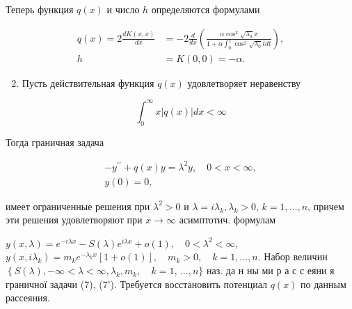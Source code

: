 \documentclass[10pt]{article}
\begin{document}
Теперь функция $q(x)$ и число $h$ определяются формулами



\[

\begin{aligned}

q(x)=2 \frac{d K(x, x)}{d x} & =-2 \frac{d}{d x}\left(\frac{\alpha \cos ^{2} \sqrt{\lambda_{0}} x}{1+\alpha \int_{0}^{x} \cos ^{2} \sqrt{\lambda_{0}} t d t}\right), \\

h & =K(0,0)=-\alpha .

\end{aligned}

\]



\begin{enumerate}

  \setcounter{enumi}{1}

  \item Пусть действительная функция $q(x)$ удовлетворяет неравенству

\end{enumerate}



\[

\int_{0}^{\infty} x|q(x)| d x<\infty

\]



Тогда граничная задача



\[

\begin{gathered}

-y^{\prime \prime}+q(x) y=\lambda^{2} y, \quad 0<x<\infty, \\

y(0)=0,

\end{gathered}

\]



имеет ограниченные решения при $\lambda^{2}>0$ и $\lambda=i \lambda_{k}, \lambda_{k}>0$, $k=1, \ldots, n$, причем эти решения удовлетворяют при $x \rightarrow \infty$ асимптотич. формулам



$y(x, \lambda)=e^{-i \lambda x}-S(\lambda) e^{i \lambda x}+o(1), \quad 0<\lambda^{2}<\infty$, $y\left(x, i \lambda_{k}\right)=m_{k} e^{-\lambda_{k} x}[1+o(1)], \quad m_{k}>0, \quad k=1, \ldots, n$. Набор величин $\left\{S(\lambda),-\infty<\lambda<\infty, \lambda_{k}, m_{k}, \quad k=1\right.$, $\ldots, n\}$ наз. да н ны ми р а с с еяни я граничної задачи (7), (7'). Требуется восстановить потенциал $q(x)$ по данным рассеяния.
\end{document}
